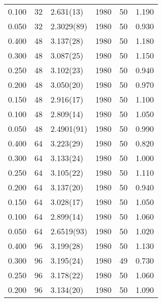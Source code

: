 \begin{tabular}{rrlrrr}
 0.100 &      32 & 2.631(13)  &                 1980 &                   50 &    1.190 \\
 0.050 &      32 & 2.3029(89) &                 1980 &                   50 &    0.930 \\
 0.400 &      48 & 3.137(28)  &                 1980 &                   50 &    1.180 \\
 0.300 &      48 & 3.087(25)  &                 1980 &                   50 &    1.150 \\
 0.250 &      48 & 3.102(23)  &                 1980 &                   50 &    0.940 \\
 0.200 &      48 & 3.050(20)  &                 1980 &                   50 &    0.970 \\
 0.150 &      48 & 2.916(17)  &                 1980 &                   50 &    1.100 \\
 0.100 &      48 & 2.809(14)  &                 1980 &                   50 &    1.050 \\
 0.050 &      48 & 2.4901(91) &                 1980 &                   50 &    0.990 \\
 0.400 &      64 & 3.223(29)  &                 1980 &                   50 &    0.820 \\
 0.300 &      64 & 3.133(24)  &                 1980 &                   50 &    1.000 \\
 0.250 &      64 & 3.105(22)  &                 1980 &                   50 &    1.110 \\
 0.200 &      64 & 3.137(20)  &                 1980 &                   50 &    0.940 \\
 0.150 &      64 & 3.028(17)  &                 1980 &                   50 &    1.050 \\
 0.100 &      64 & 2.899(14)  &                 1980 &                   50 &    1.060 \\
 0.050 &      64 & 2.6519(93) &                 1980 &                   50 &    1.020 \\
 0.400 &      96 & 3.199(28)  &                 1980 &                   50 &    1.130 \\
 0.300 &      96 & 3.195(24)  &                 1980 &                   49 &    0.730 \\
 0.250 &      96 & 3.178(22)  &                 1980 &                   50 &    1.060 \\
 0.200 &      96 & 3.134(20)  &                 1980 &                   50 &    1.090 \\

\end{tabular}
